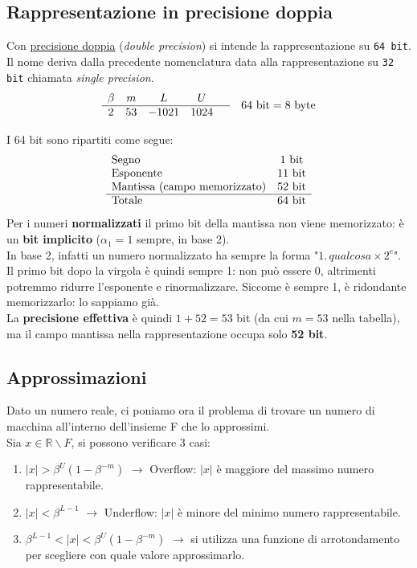 \documentclass[12pt,a4paper,]{report}
\begin{document}
\subsection{Rappresentazione in precisione doppia}
Con \uline{precisione doppia} (\textit{double precision}) si intende la rappresentazione su \texttt{64 bit}.\\
Il nome deriva dalla precedente nomenclatura data alla rappresentazione su \texttt{32 bit} chiamata \textit{single precision}.
\[
\begin{array}{c c c c c}
\beta & m & L & U & \\ \hline
2 & 53 & -1021 & 1024
\end{array}
\quad
64\ \text{bit} = 8\ \text{byte}
\]
\begin{nota}
    I 64 bit sono ripartiti come segue:
    \[
    \begin{array}{l c}
    \text{Segno} & 1\ \text{bit} \\
    \text{Esponente} & 11\ \text{bit} \\
    \text{Mantissa (campo memorizzato)} & 52\ \text{bit} \\ \hline
    \text{Totale} & 64\ \text{bit}
    \end{array}
    \]
    Per i numeri \textbf{normalizzati} il primo bit della mantissa non viene memorizzato: è un \textbf{bit implicito} ($\alpha_1 = 1$ sempre, in base 2).\\
    In base 2, infatti un numero normalizzato ha sempre la forma "$1.\,qualcosa \times 2^e$". Il primo bit dopo la virgola è quindi sempre 1: non può essere 0, altrimenti potremmo ridurre l'esponente e rinormalizzare. Siccome è sempre 1, è ridondante memorizzarlo: lo sappiamo già.\\
    La \textbf{precisione effettiva} è quindi $1 + 52 = 53$ bit (da cui $m = 53$ nella tabella), ma il campo mantissa nella rappresentazione occupa solo \textbf{52 bit}.
\end{nota}

\subsection{Approssimazioni}
Dato un numero reale, ci poniamo ora il problema di trovare un numero di macchina all'interno dell'insieme F che lo approssimi.\\
Sia $x \in \mathbb{R}\backslash F$, si possono verificare 3 casi:
\begin{enumerate}
  \item $|x| > \beta^U(1 - \beta^{-m})$ $\to$ Overflow: $|x|$ è maggiore del massimo numero rappresentabile.
  \item $|x| < \beta^{L - 1}$ $\to$ Underflow: $|x|$ è minore del minimo numero rappresentabile.
  \item $\beta^{L-1} < |x| < \beta^U(1 - \beta^{-m})$ $\to$ si utilizza una funzione di arrotondamento per scegliere con quale valore approssimarlo.
\end{enumerate}
\end{document}
